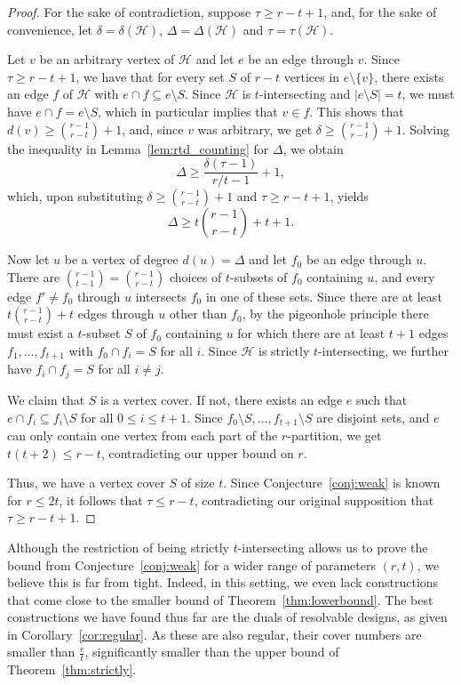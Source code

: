\documentclass[a4paper,twoside,11pt]{article}
\numberwithin{thm}{section}
\theoremstyle{definition}
\theoremstyle{remark}
\theoremstyle{definition}
\newcommand{\mc}[1]{\mathcal{#1}}
\newcommand{\m}[1]{\mathcal{#1}}
\begin{document}
\begin{proof}
For the sake of contradiction, suppose $\tau \geq r - t + 1$, and, for the sake of convenience, let $\delta = \delta(\mc H)$,  $\Delta = \Delta(\mc H)$ and $\tau = \tau(\mc H)$. 
 
Let $v$ be an arbitrary vertex of $\mc H$ and let $e$ be an edge through $v$. 
Since $\tau \geq r-t+1$, %
we have that for every set $S$ of $r - t$ vertices in $e \setminus \{v\}$, there exists an edge $f$ of $\mc H$ with $e \cap f \subseteq e \setminus S$. 
Since $\mc H$ is $t$-intersecting and $|e \setminus S| = t$, we must have $e \cap f = e \setminus S$, which in particular implies that $v \in f$. This shows that $d(v) \geq \binom{r - 1}{r - t} + 1$, and, since $v$ was arbitrary, we get $\delta \geq \binom{r - 1}{r - t} + 1$. 
Solving the inequality in Lemma~\ref{lem:rtd_counting} for $\Delta$, we obtain
\[\Delta \geq \frac{\delta(\tau - 1)}{r/t - 1} + 1,\]
which, upon substituting $\delta \geq \binom{r - 1}{r - t} + 1$ and $\tau \geq r - t + 1$, yields
\[\Delta \geq t\binom{r - 1}{r - t} + t + 1.\]

Now let $u$ be a vertex of degree $d(u) = \Delta$ and let $f_0$ be an edge through $u$. There are $\binom{r - 1}{t - 1} = \binom{r - 1}{r - t}$ choices of $t$-subsets of $f_0$ containing $u$, and every edge $f' \neq f_0$ through $u$ intersects $f_0$ in one of these sets. Since there are at least $t \binom{r - 1}{r - t} + t$ edges through $u$ other than $f_0$, by the pigeonhole principle there must exist a $t$-subset $S$ of $f_0$ containing $u$ for which there are at least $t + 1$ edges $f_1, \dots, f_{t + 1}$ with $f_0 \cap f_i = S$ for all $i$.  Since $\m H$ is strictly $t$-intersecting, we further have $f_i \cap f_j = S$ for all $i \neq j$. 

We claim that $S$ is a vertex cover. If not, there exists an edge $e$ such that $e \cap f_i \subseteq f_i \setminus S$ for all $0 \leq i \leq t + 1$. Since $f_0 \setminus S, \dots, f_{t + 1} \setminus S$ are disjoint sets, and $e$ can only contain one vertex from each part of the $r$-partition, we get $t(t + 2) \leq r - t$, contradicting our upper bound on $r$.

Thus, we have a vertex cover $S$ of size $t$. 
Since Conjecture~\ref{conj:weak} is known for $r \le 2t$, it follows that $\tau \le r - t$, contradicting our original supposition that $\tau \geq r - t + 1$. 
\end{proof}

Although the restriction of being strictly $t$-intersecting allows us to prove the bound from Conjecture~\ref{conj:weak} for a wider range of parameters $(r,t)$, we believe this is far from tight.  Indeed, in this setting, we even lack constructions that come close to the smaller bound of Theorem~\ref{thm:lowerbound}. The best constructions we have found thus far are the duals of resolvable designs, as given in Corollary~\ref{cor:regular}. As these are also regular, their cover numbers are smaller than $\frac{r}{t}$, significantly smaller than the upper bound of Theorem~\ref{thm:strictly}.
\end{document}
